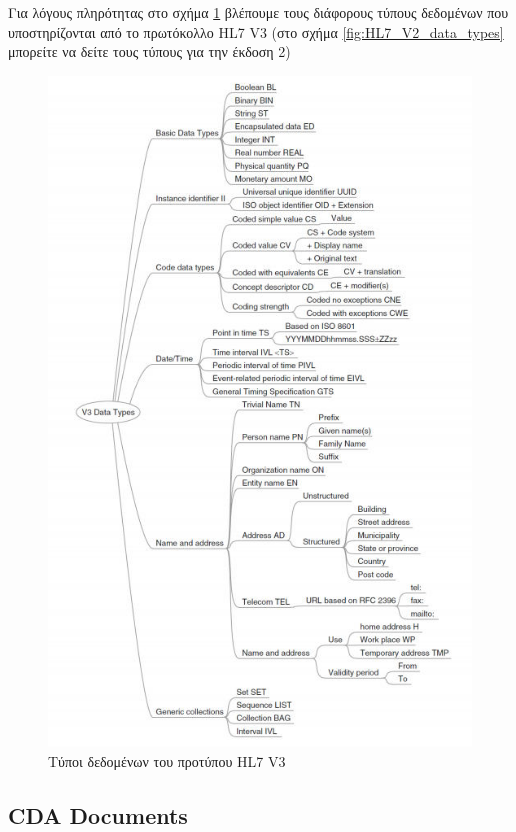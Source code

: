 	Για λόγους πληρότητας στο σχήμα \ref{fig:HL7_V3_data_types} βλέπουμε τους διάφορους τύπους δεδομένων που υποστηρίζονται από το πρωτόκολλο HL7 V3 (στο σχήμα \ref{fig:HL7_V2_data_types} μπορείτε να δείτε τους τύπους για την έκδοση 2)
\newpage
	\begin{figure}[H]
	    \centering
	    \includegraphics[width=1\textwidth]{HL7_V3_data_types.jpg}
	    \caption{Τύποι δεδομένων του προτύπου HL7 V3}
	    \label{fig:HL7_V3_data_types}
	\end{figure}
\newpage		
	\subsection{CDA Documents}
	

